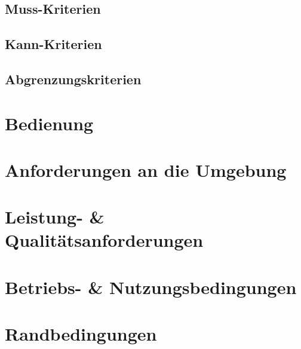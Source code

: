 \subsection{Muss-Kriterien}\label{muss-kriterien}

\subsection{Kann-Kriterien}\label{kann-kriterien}

\subsection{Abgrenzungskriterien}\label{abgrenzungskriterien}

\section{Bedienung}\label{bedienung}


\section{Anforderungen an die
Umgebung}\label{anforderungen-an-die-umgebung}

\section{Leistung- \&
Qualitätsanforderungen}\label{leistung--qualituxe4tsanforderungen}

\section{Betriebs- \&
Nutzungsbedingungen}\label{betriebs--nutzungsbedingungen}

\section{Randbedingungen}\label{randbedingungen}

